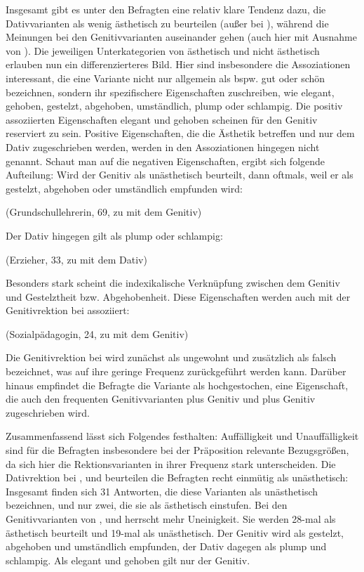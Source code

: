 Insgesamt gibt es unter den Befragten eine relativ klare Tendenz dazu, die Dativvarianten als wenig ästhetisch zu beurteilen (außer bei \gegenueber), während die Meinungen bei den Genitivvarianten auseinander gehen (auch hier mit Ausnahme von \gegenueber). 
Die jeweiligen Unterkategorien von \glqq ästhetisch\grqq{} und \glqq nicht ästhetisch\grqq{} erlauben nun ein differenzierteres Bild. 
Hier sind insbesondere die Assoziationen interessant, die eine Variante nicht nur allgemein als bspw. gut oder schön bezeichnen, sondern ihr spezifischere Eigenschaften zuschreiben, wie elegant, gehoben, gestelzt, abgehoben, umständlich, plump oder schlampig.
Die positiv assoziierten Eigenschaften elegant und gehoben scheinen für den Genitiv reserviert zu sein. 
Positive Eigenschaften, die die Ästhetik betreffen und nur dem Dativ zugeschrieben werden, werden in den Assoziationen hingegen nicht genannt. 
Schaut man auf die negativen Eigenschaften, ergibt sich folgende Aufteilung: 
Wird der Genitiv als unästhetisch beurteilt, dann oftmals, weil er als gestelzt, abgehoben oder umständlich empfunden wird: 
\begin{exe}
\ex {} (Grundschullehrerin, 69, zu \dank{} mit dem Genitiv)
\end{exe}
Der Dativ hingegen gilt als plump oder schlampig: 
\begin{exe}
\ex {} (Erzieher, 33, zu \waehrend{} mit dem Dativ)
\end{exe}

Besonders stark scheint die indexikalische Verknüpfung zwischen dem Genitiv und Gestelztheit bzw. Abgehobenheit. 
Diese Eigenschaften werden auch mit der Genitivrektion bei \gegenueber{} assoziiert: 
\begin{exe}
\ex {} (Sozialpädagogin, 24, zu \gegenueber{} mit dem Genitiv)
\end{exe}
Die Genitivrektion bei \gegenueber{} wird zunächst als ungewohnt und zusätzlich als falsch bezeichnet, was auf ihre geringe Frequenz zurückgeführt werden kann. 
Darüber hinaus empfindet die Befragte die Variante als \glqq hochgestochen\grqq, eine Eigenschaft, die auch den frequenten Genitivvarianten \wegen{} plus Genitiv und \waehrend{} plus Genitiv zugeschrieben wird. 

Zusammenfassend lässt sich Folgendes festhalten: 
Auffälligkeit und Unauffälligkeit sind für die Befragten insbesondere bei der Präposition \gegenueber{} relevante Bezugsgrößen, da sich hier die Rektionsvarianten in ihrer Frequenz stark unterscheiden. 
Die Dativrektion bei \dank, \wegen{} und \waehrend{} beurteilen die Befragten recht einmütig als unästhetisch: Insgesamt finden sich 31 Antworten, die diese Varianten als unästhetisch bezeichnen, und nur zwei, die sie als ästhetisch einstufen. 
Bei den Genitivvarianten von \dank, \wegen{} und \waehrend{} herrscht mehr Uneinigkeit. 
Sie werden 28-mal als ästhetisch beurteilt und 19-mal als unästhetisch. 
Der Genitiv wird als gestelzt, abgehoben und umständlich empfunden, der Dativ dagegen als plump und schlampig. 
Als elegant und gehoben gilt nur der Genitiv. 
